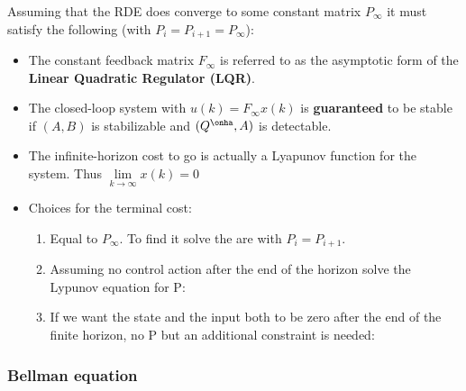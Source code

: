 \documentclass[8pt,a4paper]{scrartcl}
\begin{document}
\begin{multicols*}{3}



\finn

Assuming that the RDE does converge to some constant matrix $P_\infty$ it must satisfy the following (with $P_i=P_{i+1}=P_\infty$):


\begin{itemize}
\ncompaq
\item The constant feedback matrix $F_\infty$ is referred to as the asymptotic form of the \textbf{Linear Quadratic Regulator (LQR)}.
\item The closed-loop system with $u(k)=F_\infty x(k)$ is \textbf{guaranteed} to be stable if $(A,B)$ is stabilizable and $(Q^\onha,A)$ is detectable.
\item The infinite-horizon cost to go is actually a Lyapunov function for the system. Thus $\lim\limits_{k\rightarrow\infty}x(k)=0$
\item Choices for the terminal cost:
\begin{enumerate}
\item Equal to $P_\infty$. To find it solve the are with $P_i=P_{i+1}$.
\item Assuming no control action after the end of the horizon \dahe solve the Lypunov equation for P:


\item If we want the state and the input both to be zero after the end of the finite horizon, no P but an additional constraint is needed:


\end{enumerate}
\end{itemize}

\subsubsection{Bellman equation}


\end{multicols*}
\end{document}
